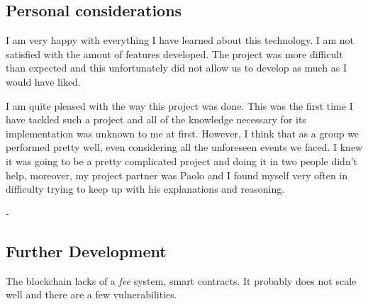 \documentclass[../documentation.tex]{subfiles}
\begin{document}
\subsection{Personal considerations}


I am very happy with everything I have learned about this technology.
I am not satisfied with the amout of features developed.
The project was more difficult than expected and this unfortunately
did not allow us to develop as much as I would have liked.


I am quite pleased with the way this project was done. This was the first time I have tackled such a project and all of the
knowledge necessary for its implementation was unknown to me at first. However, I think that as a group we performed
pretty well, even considering all the unforeseen events we faced. I knew it was going to be a pretty complicated project
and doing it in two people didn't help, moreover, my project partner was Paolo and I found myself very often in difficulty trying to
keep up with his explanations and reasoning.

-

\subsection{Further Development}

The blockchain lacks of a \textit{fee} system, smart contracts.
It probably does not scale well and there are a few vulnerabilities.
\end{document}
